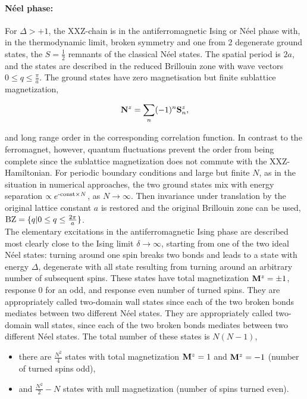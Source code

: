\documentclass{homework}
\begin{document}
\paragraph{\textbf{Néel phase:}}

For $\Delta > +1$, the XXZ-chain is in the antiferromagnetic Ising or Néel phase with, in the thermodynamic limit, broken symmetry and one from 2 degenerate ground states, the $S=\frac{1}{2}$ remnants of the classical Néel states. The spatial period is $2a$, and the states are described in the reduced Brillouin zone with wave vectors $0 \leq q \leq \frac{\pi}{a}$. The ground states have zero magnetisation but finite sublattice magnetization, 

$$
{\bf N}^z = \sum_{n} (-1)^n {\bf S}_n^z,
$$

and long range order in the corresponding correlation function. In contrast to the ferromagnet, however, quantum fluctuations prevent the order from being complete since the sublattice magnetization does not commute with the XXZ-Hamiltonian. For periodic boundary conditions and large but finite $N$, as in the situation in numerical approaches, the two ground states mix with energy separation $\propto e^{\textnormal{-const}\times N}$, as $N \rightarrow \infty$. Then invariance under translation by the original lattice constant $a$ is restored and the original Brillouin zone can be used, $\textnormal{BZ} = \{q | 0 \leq q \leq \frac{2\pi}{a}\}$. \\

The elementary excitations in the antiferromagnetic Ising phase are described most clearly close to the Ising limit $\delta \rightarrow \infty$, starting from one of the two ideal Néel states: turning around one spin breaks two bonds and leads to a state with energy $\Delta$, degenerate with all state resulting from turning around an arbitrary number of subsequent spins. These states have total magnetization ${\bf M}^z = \pm 1$, response 0 for an odd, and response even number of turned spins. They are appropriately called two-domain wall states since each of the two broken bonds mediates between two different Néel states. They are appropriately called two-domain wall states, since each of the two broken bonds mediates between two different Néel states. The total number of these states is $N(N-1)$, 

\begin{itemize}
    \item there are $\frac{N^2}{4}$ states with total magnetization ${\bf M}^z= 1$ and ${\bf M}^z= -1$ (number of turned spins odd),
    \item and $\frac{N^2}{2}-N$ states with null magnetization (number of spins turned even). 
\end{itemize}
\end{document}
